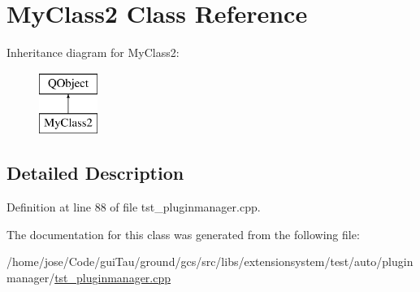 \hypertarget{class_my_class2}{\section{My\-Class2 Class Reference}
\label{class_my_class2}
}
Inheritance diagram for My\-Class2\-:\begin{figure}[H]
\begin{center}
\leavevmode
\includegraphics[height=2.000000cm]{class_my_class2}
\end{center}
\end{figure}


\subsection{Detailed Description}


Definition at line 88 of file tst\-\_\-pluginmanager.\-cpp.



The documentation for this class was generated from the following file\-:\begin{DoxyCompactItemize}
\item 
/home/jose/\-Code/gui\-Tau/ground/gcs/src/libs/extensionsystem/test/auto/pluginmanager/\hyperlink{tst__pluginmanager_8cpp}{tst\-\_\-pluginmanager.\-cpp}\end{DoxyCompactItemize}
